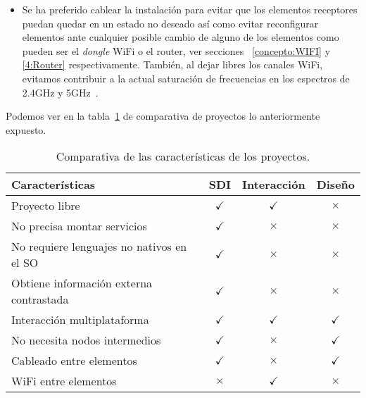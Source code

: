 \begin{itemize}
\item
    Se ha preferido cablear la instalación para evitar que los elementos receptores puedan quedar en un estado no deseado así como evitar reconfigurar elementos ante cualquier posible cambio de alguno de los elementos como pueden ser el \textit{dongle} WiFi o el router, ver secciones ~\ref{concepto:WIFI} y \ref{4:Router} respectivamente.
    También, al dejar libres los canales WiFi, evitamos contribuir a la actual saturación de frecuencias en los espectros de 2.4GHz y 5GHz~\cite{manual:IEEE802.11}.

\end{itemize}


Podemos ver en la tabla~\ref{tabla:comparativa-proyectos} de comparativa de proyectos lo anteriormente expuesto.

\begin{itemize}
\tightlist
\end{itemize}
\begin{table}
\centering
\begin{tabular}{lccc}
\toprule
Características & SDI & Interacción & Diseño  \\
\midrule
Proyecto libre                          & \cellcolor{green!25} {$\checkmark$} & \cellcolor{green!25} {$\checkmark$} & \cellcolor{red!25} {$\times$} \\
No precisa montar servicios             & \cellcolor{green!25} {$\checkmark$} & \cellcolor{red!25} {$\times$} & \cellcolor{red!25} {$\times$} \\
No requiere lenguajes no nativos en el SO  & \cellcolor{green!25} {$\checkmark$} & \cellcolor{red!25} {$\times$} & \cellcolor{red!25} {$\times$} \\
Obtiene información externa contrastada & \cellcolor{green!25} {$\checkmark$} & \cellcolor{red!25} {$\times$} & \cellcolor{red!25} {$\times$} \\
Interacción multiplataforma             & \cellcolor{green!25} {$\checkmark$} & \cellcolor{green!25} {$\checkmark$} & \cellcolor{green!25} {$\checkmark$} \\
No necesita nodos intermedios           & \cellcolor{green!25} {$\checkmark$} & \cellcolor{red!25} {$\times$} & \cellcolor{green!25} {$\checkmark$} \\
Cableado entre elementos                & \cellcolor{green!25} {$\checkmark$} & \cellcolor{red!25} {$\times$} & \cellcolor{green!25} {$\checkmark$} \\
WiFi entre elementos                    & \cellcolor{red!25} {$\times$} & \cellcolor{green!25} {$\checkmark$} & \cellcolor{red!25} {$\times$} \\
\bottomrule
\end{tabular}
\caption{Comparativa de las características de los proyectos.}
\label{tabla:comparativa-proyectos}
\end{table}

